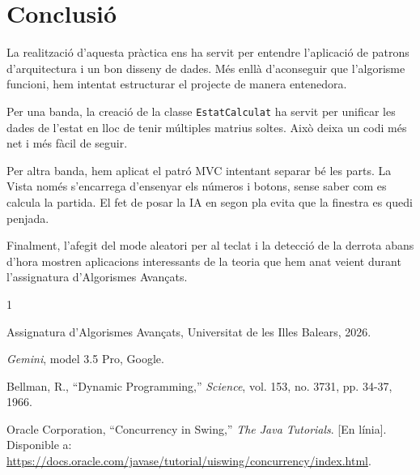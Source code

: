 \documentclass[compsoc, a4paper]{IEEEtran}
\begin{document}
\section{Conclusió}

La realització d'aquesta pràctica ens ha servit per entendre l'aplicació de patrons d'arquitectura i un bon disseny de dades. Més enllà d'aconseguir que l'algorisme funcioni, hem intentat estructurar el projecte de manera entenedora.

Per una banda, la creació de la classe \texttt{EstatCalculat} ha servit per unificar les dades de l'estat en lloc de tenir múltiples matrius soltes. Això deixa un codi més net i més fàcil de seguir.

Per altra banda, hem aplicat el patró MVC intentant separar bé les parts. La Vista només s'encarrega d'ensenyar els números i botons, sense saber com es calcula la partida. El fet de posar la IA en segon pla evita que la finestra es quedi penjada.

Finalment, l'afegit del mode aleatori per al teclat i la detecció de la derrota abans d'hora mostren aplicacions interessants de la teoria que hem anat veient durant l'assignatura d'Algorismes Avançats.

\begin{thebibliography}{1}

Assignatura d'Algorismes Avançats, Universitat de les Illes Balears, 2026.

\textit{Gemini}, model 3.5 Pro, Google.

Bellman, R., ``Dynamic Programming,'' \textit{Science}, vol. 153, no. 3731, pp. 34-37, 1966.

Oracle Corporation, ``Concurrency in Swing,'' \textit{The Java Tutorials}. [En línia]. Disponible a: \url{https://docs.oracle.com/javase/tutorial/uiswing/concurrency/index.html}.

\end{thebibliography}
\end{document}

